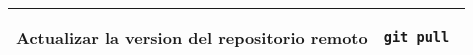 \documentclass[landscape]{article}
\begin{document}
\begin{table}[ht]
\begin{center}
\begin{tabular}{| l | l |}
Actualizar la version del repositorio remoto &
\begin{lstlisting}
git pull 
\end{lstlisting}\\ \hline

\end{tabular}
\end{center}
\end{table}
\end{document}

